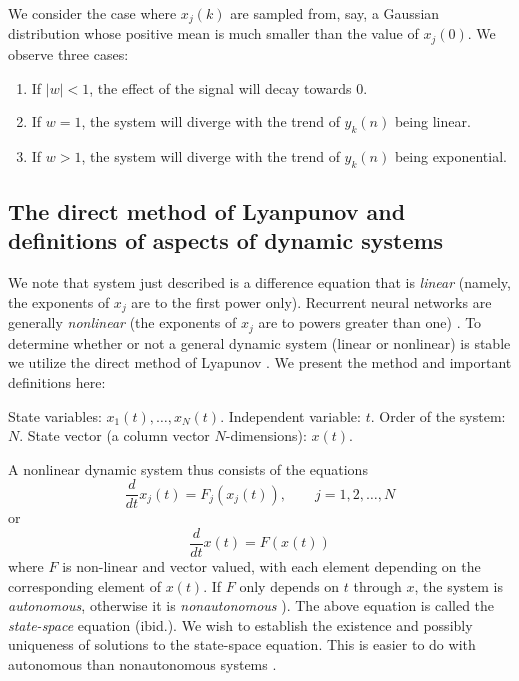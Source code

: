 We consider the case where $x_j(k)$ are sampled from, say, a Gaussian distribution whose positive mean is much smaller than the value of $x_j(0)$. We observe three cases:

\begin{enumerate}
\item If $|w| < 1$, the effect of the signal will decay towards $0$.
\item If $w = 1$, the system will diverge with the trend of $y_k(n)$ being linear. 
\item If $w > 1$, the system will diverge with the trend of $y_k(n)$ being exponential.  
\end{enumerate}

\subsection{The direct method of Lyanpunov and definitions of aspects of dynamic systems}

We note that system just described is a difference equation that is \emph{linear} (namely, the exponents of $x_j$ are to the first power only). Recurrent neural networks are generally \emph{nonlinear} (the exponents of $x_j$ are to powers greater than one) \cite[p. 6]{strogatz:2000}. To determine whether or not a general dynamic system (linear or nonlinear) is stable we utilize the direct method of Lyapunov \cite[p. 674]{Haykin:2009:NNC:1213811}. We present the method and important definitions here:

\begin{definition}
  State variables: $x_1(t), \ldots, x_N(t)$. Independent variable: $t$. Order of the system: $N$. State vector (a column vector $N$-dimensions): $x(t)$.
\end{definition}

A nonlinear dynamic system thus consists of the equations
%
\begin{equation*}
  \frac{d}{dt}x_j(t) = F_j \left(x_j(t)\right), \qquad j = 1, 2, \ldots, N
\end{equation*}
%
or
%
\begin{equation*}
  \frac{d}{dt}x(t) = F \left(x(t)\right)
\end{equation*}
%
where $F$ is non-linear and vector valued, with each element depending on the corresponding element of $x(t)$. If $F$ only depends on $t$ through $x$, the system is \emph{autonomous}, otherwise it is \emph{nonautonomous} \cite[p. 675]{Haykin:2009:NNC:1213811}). The above equation is called the \emph{state-space} equation (ibid.). We wish to establish the existence and possibly uniqueness of solutions to the state-space equation. This is easier to do with autonomous than nonautonomous systems \cite[p. 180]{DBLP:journals/ai/Beer95}.

